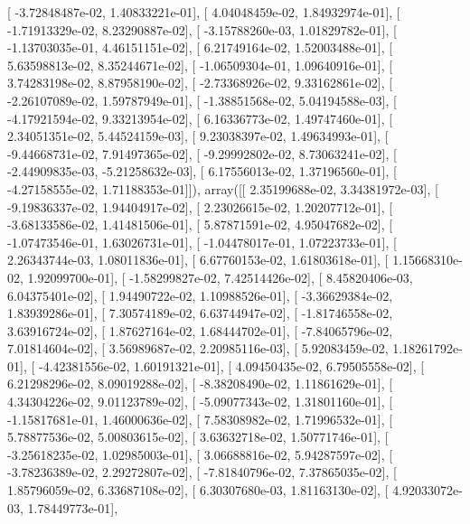 \documentclass{article}
\begin{document}
       [ -3.72848487e-02,   1.40833221e-01],
       [  4.04048459e-02,   1.84932974e-01],
       [ -1.71913329e-02,   8.23290887e-02],
       [ -3.15788260e-03,   1.01829782e-01],
       [ -1.13703035e-01,   4.46151151e-02],
       [  6.21749164e-02,   1.52003488e-01],
       [  5.63598813e-02,   8.35244671e-02],
       [ -1.06509304e-01,   1.09640916e-01],
       [  3.74283198e-02,   8.87958190e-02],
       [ -2.73368926e-02,   9.33162861e-02],
       [ -2.26107089e-02,   1.59787949e-01],
       [ -1.38851568e-02,   5.04194588e-03],
       [ -4.17921594e-02,   9.33213954e-02],
       [  6.16336773e-02,   1.49747460e-01],
       [  2.34051351e-02,   5.44524159e-03],
       [  9.23038397e-02,   1.49634993e-01],
       [ -9.44668731e-02,   7.91497365e-02],
       [ -9.29992802e-02,   8.73063241e-02],
       [ -2.44909835e-03,  -5.21258632e-03],
       [  6.17556013e-02,   1.37196560e-01],
       [ -4.27158555e-02,   1.71188353e-01]]), array([[  2.35199688e-02,   3.34381972e-03],
       [ -9.19836337e-02,   1.94404917e-02],
       [  2.23026615e-02,   1.20207712e-01],
       [ -3.68133586e-02,   1.41481506e-01],
       [  5.87871591e-02,   4.95047682e-02],
       [ -1.07473546e-01,   1.63026731e-01],
       [ -1.04478017e-01,   1.07223733e-01],
       [  2.26343744e-03,   1.08011836e-01],
       [  6.67760153e-02,   1.61803618e-01],
       [  1.15668310e-02,   1.92099700e-01],
       [ -1.58299827e-02,   7.42514426e-02],
       [  8.45820406e-03,   6.04375401e-02],
       [  1.94490722e-02,   1.10988526e-01],
       [ -3.36629384e-02,   1.83939286e-01],
       [  7.30574189e-02,   6.63744947e-02],
       [ -1.81746558e-02,   3.63916724e-02],
       [  1.87627164e-02,   1.68444702e-01],
       [ -7.84065796e-02,   7.01814604e-02],
       [  3.56989687e-02,   2.20985116e-03],
       [  5.92083459e-02,   1.18261792e-01],
       [ -4.42381556e-02,   1.60191321e-01],
       [  4.09450435e-02,   6.79505558e-02],
       [  6.21298296e-02,   8.09019288e-02],
       [ -8.38208490e-02,   1.11861629e-01],
       [  4.34304226e-02,   9.01123789e-02],
       [ -5.09077343e-02,   1.31801160e-01],
       [ -1.15817681e-01,   1.46000636e-02],
       [  7.58308982e-02,   1.71996532e-01],
       [  5.78877536e-02,   5.00803615e-02],
       [  3.63632718e-02,   1.50771746e-01],
       [ -3.25618235e-02,   1.02985003e-01],
       [  3.06688816e-02,   5.94287597e-02],
       [ -3.78236389e-02,   2.29272807e-02],
       [ -7.81840796e-02,   7.37865035e-02],
       [  1.85796059e-02,   6.33687108e-02],
       [  6.30307680e-03,   1.81163130e-02],
       [  4.92033072e-03,   1.78449773e-01],
\end{document}
